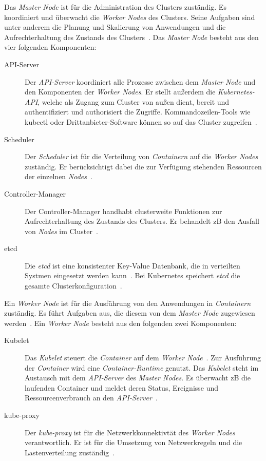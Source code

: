Das \textit{Master Node} ist für die Administration des Clusters zuständig. Es koordiniert und überwacht die \textit{Worker Nodes} des Clusters.
Seine Aufgaben sind unter anderem die Planung und Skalierung von Anwendungen und die Aufrechterhaltung des Zustands des Clusters~\cite{kubernetes-cluster-vmware}.
Das \textit{Master Node} besteht aus den vier folgenden Komponenten:
\begin{description}
      \item[API-Server]
            Der \textit{API-Server} koordiniert alle Prozesse zwischen dem \textit{Master Node} und den Komponenten der \textit{Worker Nodes}.
            Er stellt außerdem die \textit{Kubernetes-API}, welche als Zugang zum Cluster von außen dient, bereit und authentifiziert und authorisiert die Zugriffe.
            Kommandozeilen-Tools wie kubectl oder Drittanbieter-Software können so auf das Cluster zugreifen~\cite{kubernetes-devopscube}.
      \item[Scheduler]
            Der \textit{Scheduler} ist für die Verteilung von \textit{Containern} auf die \textit{Worker Nodes} zuständig.
            Er berücksichtigt dabei die zur Verfügung stehenden Ressourcen der einzelnen \textit{Nodes}~\cite{kubernetes-cluster-ionos}.
      \item[Controller-Manager]
            Der Controller-Manager handhabt clusterweite Funktionen zur Aufrechterhaltung des Zustands des Clusters. Er behandelt \ac{zB} den Ausfall von \textit{Nodes}
            im Cluster~\cite{kubernetes-in-action-introduction}.
      \item[etcd]
            Die \textit{etcd} ist eine konsistenter Key-Value Datenbank, die in verteilten Systmen eingesetzt werden kann~\cite{etcd-ibm}.
            Bei Kubernetes speichert \textit{etcd} die gesamte Clusterkonfiguration~\cite{kubernetes-in-action-introduction}.
\end{description}

Ein \textit{Worker Node} ist für die Ausführung von den Anwendungen in \textit{Containern} zuständig.
Es führt Aufgaben aus, die diesem von dem \textit{Master Node} zugewiesen werden~\cite{kubernetes-cluster-vmware}.
Ein \textit{Worker Node} besteht aus den folgenden zwei Komponenten:
\begin{description}
      \item[Kubelet]
            Das \textit{Kubelet} steuert die \textit{Container} auf dem \textit{Worker Node}~\cite{kubernetes-in-action-introduction}.
            Zur Ausführung der \textit{Container} wird eine \textit{Container-Runtime} genutzt.
            Das \textit{Kubelet} steht im Austausch mit dem \textit{API-Server} des \textit{Master Nodes}. Es überwacht \ac{zB} die laufenden Container
            und meldet deren Status, Ereignisse und Ressourcenverbrauch an den \textit{API-Server}~\cite{kubernetes-in-action-chapter-11}.
      \item[kube-proxy]
            Der \textit{kube-proxy} ist für die Netzwerkkonnektivtät des \textit{Worker Nodes} verantwortlich.
            Er ist für die Umsetzung von Netzwerkregeln und die Lastenverteilung zuständig~\cite{kubernetes-in-action-introduction,kubernetes-cluster-vmware}.
\end{description}

